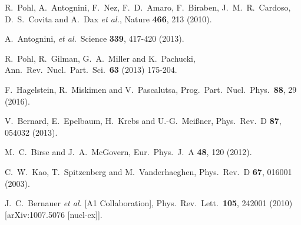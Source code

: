 \documentclass[twocolumn,prc,showpacs,nofootinbib,preprintnumbers,amsmath,amssymb,superscriptaddress]{revtex4-1}
\begin{document}
\begin{thebibliography}{99} 

  R.~Pohl, A.~Antognini, F.~Nez, F.~D.~Amaro, F.~Biraben, J.~M.~R.~Cardoso, D.~S.~Covita and A.~Dax {\it et al.},
  Nature {\bf 466}, 213 (2010).
  
A.~Antognini, {\it et al.}\, Science {\bf 339}, 417-420 (2013).

  
  R.~Pohl, R.~Gilman, G.~A.~Miller and K.~Pachucki,
Ann.\ Rev.\ Nucl.\ Part.\ Sci.\ {\bf 63} (2013) 175-204.
  
  F.~Hagelstein, R.~Miskimen and V.~Pascalutsa,
  Prog.\ Part.\ Nucl.\ Phys.\  {\bf 88}, 29 (2016). 
  
  V.~Bernard, E.~Epelbaum, H.~Krebs and U.-G.~Mei\ss ner,
  Phys.\ Rev.\ D {\bf 87}, 054032 (2013).
  
   
  M.~C.~Birse and J.~A.~McGovern,
  Eur.\ Phys.\ J.\ A {\bf 48}, 120 (2012).
  
  C.~W.~Kao, T.~Spitzenberg and M.~Vanderhaeghen,
  Phys.\ Rev.\ D {\bf 67}, 016001 (2003).
  
  J.~C.~Bernauer {\it et al.}  [A1 Collaboration],
  Phys.\ Rev.\ Lett.\  {\bf 105}, 242001 (2010)
  [arXiv:1007.5076 [nucl-ex]].
  

\end{thebibliography}
\end{document}
